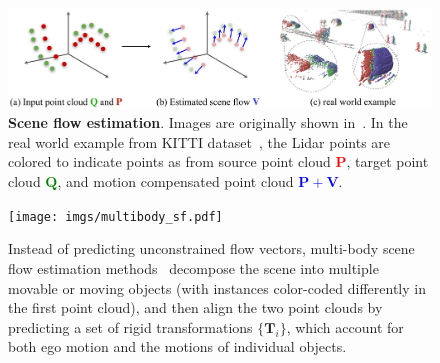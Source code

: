 \begin{figure}[t]
    \centering
    \includegraphics[width=1.0\columnwidth]{imgs/sceneflow.pdf}
    \caption{\textbf{Scene flow estimation}. Images are originally shown in~\cite{liu2019flownet3d}. In the real world example from KITTI dataset~\cite{geiger2012we}, the Lidar points are colored to indicate points as from source point cloud \textcolor{red}{$\mathbf{P}$}, target point cloud \textcolor{green}{$\mathbf{Q}$}, and motion compensated point cloud \textcolor{blue}{$\mathbf{P} + \mathbf{V}$}.}
    \label{fig:bg_sceneflow}
\end{figure}

\begin{figure}[t]
    \centering
    \texttt{[image: imgs/multibody\_sf.pdf]}
    \caption{Instead of predicting unconstrained flow vectors, multi-body scene flow estimation methods~\cite{huang2022dynamic,gojcic2021weakly,zhu2023living} decompose the scene into multiple movable or moving objects (with instances color-coded differently in the first point cloud), and then align the two point clouds by predicting a set of rigid transformations $\{\mathbf{T}_i\}$, which account for both ego motion and the motions of individual objects.}
    \label{fig:bg_multibody_sf}
\end{figure}


